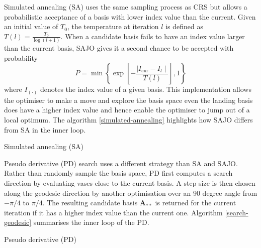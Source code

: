 Simulated annealing (SA)
\citep{kirkpatrick1983optimization, bertsimas1993simulated} uses the
same sampling process as CRS but allows a probabilistic acceptance of a
basis with lower index value than the current. Given an initial value of
\(T_0\), the temperature at iteration \(l\) is defined as
\(T(l) = \frac{T_0}{\log(l + 1)}\). When a candidate basis fails to have
an index value larger than the current basis, SAJO gives it a second
chance to be accepted with probability
\[P= \min\left\{\exp\left[-\frac{\mid I_{\text{cur}} - I_{l} \mid}{T(l)}\right],1\right\}\]
where \(I_{(\cdot)}\) denotes the index value of a given basis. This
implementation allows the optimiser to make a move and explore the basis
space even the landing basis does have a higher index value and hence
enable the optimiser to jump out of a local optimum. The algorithm
\ref{simulated-annealing} highlights how SAJO differs from SA in the
inner loop.

\begin{algorithm}
\SetAlgoLined
{}
  \caption{Simulated annealing (SA)}
  \label{simulated-annealing}
\end{algorithm}

Pseudo derivative (PD) search \citep{cook1995grand} uses a different
strategy than SA and SAJO. Rather than randomly sample the basis space,
PD first computes a search direction by evaluating vases close to the
current basis. A step size is then chosen along the geodesic direction
by another optimisation over an 90 degree angle from \(-\pi/4\) to
\(\pi/4\). The resulting candidate basis \(\mathbf{A}_{**}\) is returned
for the current iteration if it has a higher index value than the
current one. Algorithm \ref{search-geodesic} summarises the inner loop
of the PD.

\begin{algorithm}
\SetAlgoLined
{}
\caption{Pseudo derivative (PD)}
\label{search-geodesic}
\end{algorithm}


